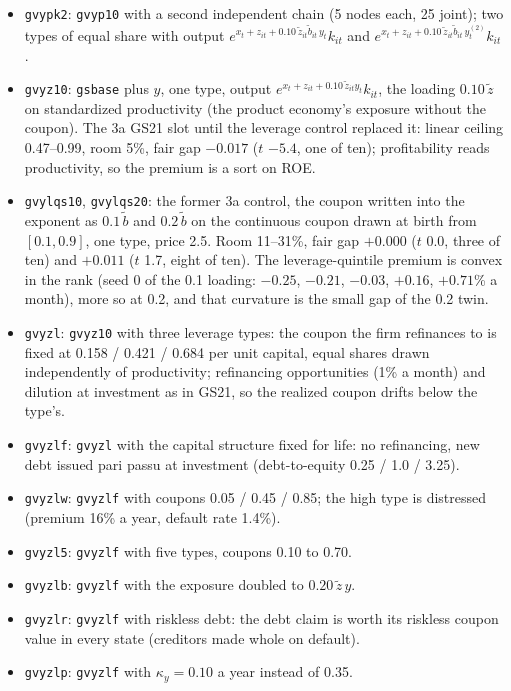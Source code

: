 \begin{itemize}
\item \texttt{gvypk2}: \texttt{gvyp10} with a second independent chain (5 nodes each, 25 joint); two types of equal share with output $e^{x_t+z_{it}+0.10\,\tilde z_{it}\tilde b_{it}\,y_t}k_{it}$ and $e^{x_t+z_{it}+0.10\,\tilde z_{it}\tilde b_{it}\,y^{(2)}_t}k_{it}$.
\item \texttt{gvyz10}: \texttt{gsbase} plus $y$, one type, output $e^{x_t+z_{it}+0.10\,\tilde z_{it} y_t} k_{it}$, the loading $0.10\,\tilde z$ on standardized productivity (the product economy's exposure without the coupon). The 3a GS21 slot until the leverage control replaced it: linear ceiling 0.47--0.99, room 5\%, fair gap $-0.017$ ($t$ $-5.4$, one of ten); profitability reads productivity, so the premium is a sort on ROE.
\item \texttt{gvylqs10}, \texttt{gvylqs20}: the former 3a control, the coupon written into the exponent as $0.1\,\tilde b$ and $0.2\,\tilde b$ on the continuous coupon drawn at birth from $[0.1, 0.9]$, one type, price 2.5. Room 11--31\%, fair gap $+0.000$ ($t$ 0.0, three of ten) and $+0.011$ ($t$ 1.7, eight of ten). The leverage-quintile premium is convex in the rank (seed 0 of the 0.1 loading: $-0.25$, $-0.21$, $-0.03$, $+0.16$, $+0.71$\% a month), more so at 0.2, and that curvature is the small gap of the 0.2 twin.
\item \texttt{gvyzl}: \texttt{gvyz10} with three leverage types: the coupon the firm refinances to is fixed at 0.158 / 0.421 / 0.684 per unit capital, equal shares drawn independently of productivity; refinancing opportunities (1\% a month) and dilution at investment as in GS21, so the realized coupon drifts below the type's.
\item \texttt{gvyzlf}: \texttt{gvyzl} with the capital structure fixed for life: no refinancing, new debt issued pari passu at investment (debt-to-equity 0.25 / 1.0 / 3.25).
\item \texttt{gvyzlw}: \texttt{gvyzlf} with coupons 0.05 / 0.45 / 0.85; the high type is distressed (premium 16\% a year, default rate 1.4\%).
\item \texttt{gvyzl5}: \texttt{gvyzlf} with five types, coupons 0.10 to 0.70.
\item \texttt{gvyzlb}: \texttt{gvyzlf} with the exposure doubled to $0.20\,\tilde z\,y$.
\item \texttt{gvyzlr}: \texttt{gvyzlf} with riskless debt: the debt claim is worth its riskless coupon value in every state (creditors made whole on default).
\item \texttt{gvyzlp}: \texttt{gvyzlf} with $\kappa_y=0.10$ a year instead of 0.35.

\end{itemize}
